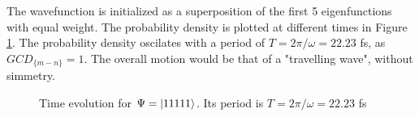 \documentclass{cis320}
\begin{document}
The wavefunction is initialized as a superposition of the first 5 eigenfunctions with equal weight. The probability density is plotted at different times in Figure \ref{fig:H11111}. The probability density oscilates with a period of $T=2\pi/\omega=22.23$ fs, as $GCD_{\{m-n\}}=1$. The overall motion would be that of a "travelling wave", without simmetry.
\begin{figure}[h!]
    \centering
    \caption{Time evolution for $\Psi = \ket{11111}$. Its period is $T=2\pi/\omega=22.23$ fs}
    \label{fig:H11111}
\end{figure}
\end{document}
